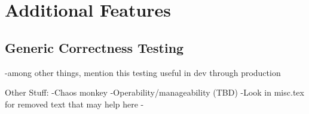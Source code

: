 \section{Additional Features}
\label{section:other}
%

\subsection{Generic Correctness Testing}
-among other things, mention this testing useful in dev through production

Other Stuff:
-Chaos monkey
-Operability/manageability (TBD)
-Look in misc.tex for removed text that may help here
-
